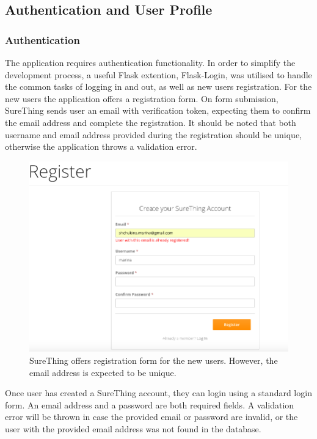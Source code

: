 \subsection{Authentication and User Profile}

\subsubsection*{Authentication}
The application requires authentication functionality. In order to simplify the development process, a useful Flask extention, Flask-Login, was utilised to handle the common tasks of logging in and out, as well as new users registration. For the new users the application offers a registration form. On form submission, SureThing sends user an email with verification token, expecting them to confirm the email address and complete the registration. It should be noted that both username and email address provided during the registration should be unique, otherwise the application throws a validation error.

\begin{figure}[H]
	\begin{center}
		\includegraphics[width=.90\columnwidth]{impl/images/registrationFormError}
		\caption{SureThing offers registration form for the new users. However, the email address is expected to be unique.} \label{fig:registrationformerror}
	\end{center}
\end{figure}

Once user has created a SureThing account, they can login using a standard login form.  An email address and a password are both required fields. A validation error will be thrown in case the provided email or password are invalid, or the user with the provided email address was not found in the database.


